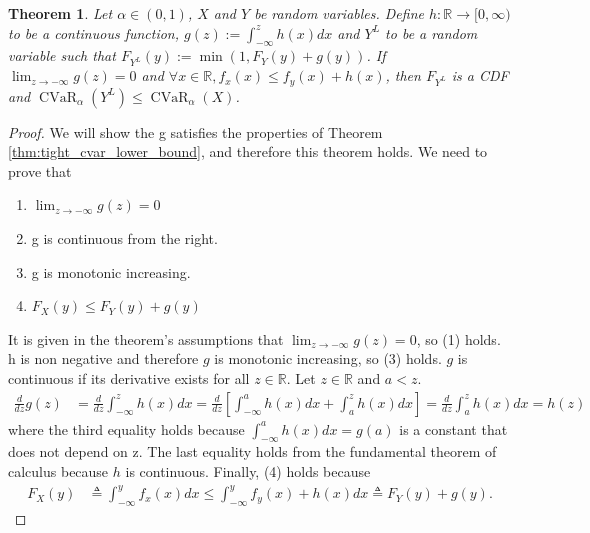 \documentclass[acmlarge, manuscript, screen, review, natbib=false, oneside]{acmart}
\newtheorem{theorem}{Theorem}[section]
\DeclareMathOperator{\CVaR}{CVaR}
\begin{document}
\begin{theorem}\label{prf:lower_cvar_bound_using_density_bound}
	Let $\alpha \in (0,1)$, $X$ and $Y$ be random variables. Define $h:\mathbb{R}\rightarrow [0,\infty)$ to be a continuous function, $g(z):=\int_{-\infty}^z h(x)dx$ and $Y^L$ to be a random variable such that $F_{Y^L}(y):=\min(1, F_{Y}(y) + g(y))$. If $\lim_{z\rightarrow -\infty} g(z)=0$ and $\forall x\in \mathbb{R},f_x(x)\leq f_y(x) + h(x)$, then $F_{Y^L}$ is a CDF and $\CVaR_\alpha(Y^L)\leq \CVaR_\alpha(X)$.
\end{theorem}
\begin{proof}
	We will show the g satisfies the properties of Theorem \ref{thm:tight_cvar_lower_bound}, and therefore this theorem holds. We need to prove that \begin{enumerate}
		\item $\lim_{z\rightarrow -\infty} g(z)=0$
		\item g is continuous from the right.
		\item g is monotonic increasing.
		\item $F_X(y)\leq F_Y(y) + g(y)$
	\end{enumerate}
	It is given in the theorem's assumptions that $\lim_{z\rightarrow -\infty} g(z)=0$, so (1) holds. h is non negative and therefore $g$ is monotonic increasing, so (3) holds. $g$ is continuous if its derivative exists for all $z\in \mathbb{R}$. Let $z\in \mathbb{R}$ and $a<z$.
	\begin{equation}
		\begin{aligned}
			\frac{d}{dz}g(z) &= \frac{d}{dz}\int_{-\infty}^z h(x)dx = \frac{d}{dz}[\int_{-\infty}^a h(x)dx + \int_{a}^z h(x)dx] 
			=\frac{d}{dz}\int_{a}^z h(x)dx = h(z)
		\end{aligned}
	\end{equation}
	where the third equality holds because $\int_{-\infty}^a h(x)dx = g(a)$ is a constant that does not depend on z. The last equality holds from the fundamental theorem of calculus because $h$ is continuous. Finally, (4) holds because \begin{equation}
		\begin{aligned}
			F_X(y) &\triangleq \int_{-\infty}^y f_x(x)dx\leq \int_{-\infty}^y f_y(x) + h(x)dx 
			\triangleq F_Y(y) + g(y).
		\end{aligned}
	\end{equation}
\end{proof}
\end{document}
